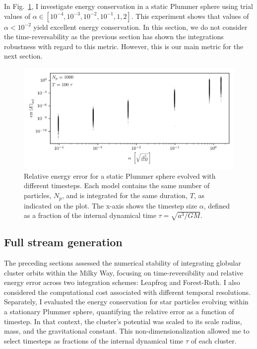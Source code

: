        In Fig.~\ref{fig:numericalErrorStaticPlummerSphereEnergyError}, I investigate energy conservation in a static Plummer sphere using trial values of $\alpha \in [10^{-4}, 10^{-3}, 10^{-2}, 10^{-1}, 1, 2]$. This experiment shows that values of $\alpha < 10^{-2}$ yield excellent energy conservation. In this section, we do not consider the time-reversability as the previous section has shown the integrations robustness with regard to this metric. However, this is our main metric for the next section.

        \begin{figure}
            \centering
            \includegraphics[width=\linewidth]{images/numericalErrorStaticPlummerSphereEnergyError.png}
            \caption{Relative energy error for a static Plummer sphere evolved with different timesteps. Each model contains the same number of particles, $N_p$, and is integrated for the same duration, $T$, as indicated on the plot. The x-axis shows the timestep size $\alpha$, defined as a fraction of the internal dynamical time $\tau = \sqrt{a^3 / GM}$.}
            \label{fig:numericalErrorStaticPlummerSphereEnergyError}
        \end{figure}

    \subsection{Full stream generation}
        The preceding sections assessed the numerical stability of integrating globular cluster orbits within the Milky Way, focusing on time-reversibility and relative energy error across two integration schemes: Leapfrog and Forest-Ruth. I also considered the computational cost associated with different temporal resolutions. Separately, I evaluated the energy conservation for star particles evolving within a stationary Plummer sphere, quantifying the relative error as a function of timestep. In that context, the cluster's potential was scaled to its scale radius, mass, and the gravitational constant. This non-dimensionalization allowed me to select timesteps as fractions of the internal dynamical time $\tau$ of each cluster. 


